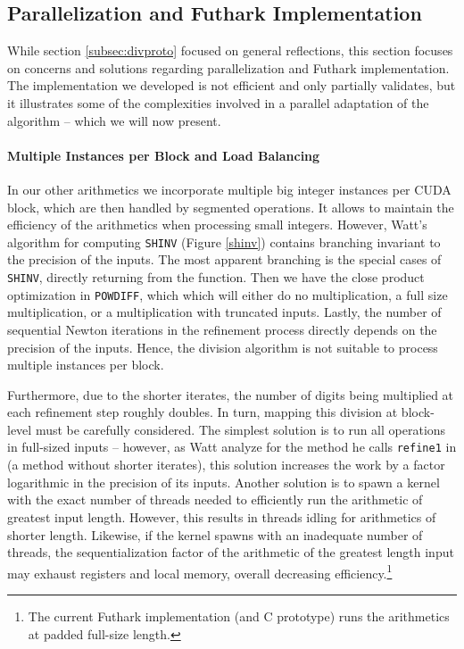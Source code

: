 \subsection{Parallelization and Futhark Implementation}
\label{subsec:divfut}

While section \ref{subsec:divproto} focused on general reflections, this section
focuses on concerns and solutions regarding parallelization and Futhark
implementation. The implementation we developed is not efficient and only
partially validates, but it illustrates some of the complexities involved in a
parallel adaptation of the algorithm -- which we will now present.

\paragraph{Multiple Instances per Block and Load Balancing}
In our other arithmetics we incorporate multiple big integer instances per CUDA
block, which are then handled by segmented operations. It allows to maintain the
efficiency of the arithmetics when processing small integers. However, Watt's
algorithm for computing \texttt{SHINV} (Figure \ref{shinv}) contains branching
invariant to the precision of the inputs. The most apparent branching is the
special cases of \texttt{SHINV}, directly returning from the function. Then we
have the close product optimization in \texttt{POWDIFF}, which which will either
do no multiplication, a full size multiplication, or a multiplication with
truncated inputs. Lastly, the number of sequential Newton iterations in the
refinement process directly depends on the precision of the inputs.  Hence, the
division algorithm is not suitable to process multiple instances per block.

Furthermore, due to the shorter iterates, the number of digits being multiplied
at each refinement step roughly doubles. In turn, mapping this division at
block-level must be carefully considered. The simplest solution is to run all
operations in full-sized inputs -- however, as Watt analyze for the method he
calls \texttt{refine1} in \cite{watt2023efficient} (a method without shorter
iterates), this solution increases the work by a factor logarithmic in the
precision of its inputs. Another solution is to spawn a kernel with the exact
number of threads needed to efficiently run the arithmetic of greatest input
length. However, this results in threads idling for arithmetics of shorter
length. Likewise, if the kernel spawns with an inadequate number of threads, the
sequentialization factor of the arithmetic of the greatest length input may
exhaust registers and local memory, overall decreasing efficiency.\footnote{The
  current Futhark implementation (and C prototype) runs the arithmetics at
  padded full-size length.}

